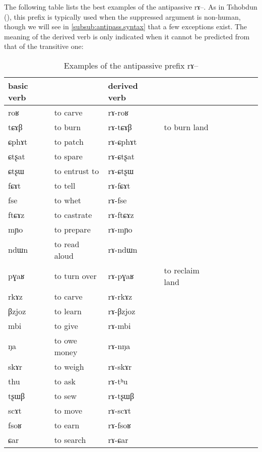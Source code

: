 \documentclass[oldfontcommands,oneside,a4paper,11pt]{memoir}
\newcommand{\ipa}[1]{{\phon #1}} %
\begin{document}
The following table lists the best examples of the antipassive \ipa{rɤ}--. As in Tshobdun (\citealt[8]{jackson06paisheng}), this prefix is typically used when the suppressed argument is non-human, though we will see in \ref{subsub:antipass.syntax} that a few exceptions exist. The meaning of the derived verb is only indicated when it cannot be predicted from that of the transitive one:
\begin{table}[H]
\caption{Examples of the antipassive prefix  \ipa{rɤ}--}\label{tab:antipassive1}
\begin{tabular}{lllllllll} \toprule
basic verb  & &derived  verb &\\
\midrule
\ipa{roʁ}   &	to carve &  	\ipa{rɤ-roʁ}   &	 \\  
\ipa{tɕɤβ}   &	to burn &  	\ipa{rɤ-tɕɤβ}   &	to burn land \\  
\ipa{ɕphɤt}   &	to patch &  	\ipa{rɤ-ɕphɤt}   &	 \\  
\ipa{ɕtʂat}   &	to spare &  	\ipa{rɤ-ɕtʂat}   &	 \\  
\ipa{ɕtʂɯ}   &	to entrust to &  	\ipa{rɤ-ɕtʂɯ}   &	 \\  
\ipa{fɕɤt}   &	to tell &  	\ipa{rɤ-fɕɤt}   &	 \\  
\ipa{fse}   &	to whet &  	\ipa{rɤ-fse}   &	 \\  
\ipa{ftɕɤz}   &	to castrate &  	\ipa{rɤ-ftɕɤz}   &	 \\  
\ipa{mɲo}   &	to prepare &  	\ipa{rɤ-mɲo}   &	 \\  
\ipa{ndɯn}   &	to read aloud &  	\ipa{rɤ-ndɯn}   &	 \\  
\ipa{pɣaʁ}   &	to turn over &  	\ipa{rɤ-pɣaʁ}   &	to reclaim land \\  
\ipa{rkɤz}   &	to carve &  	\ipa{rɤ-rkɤz}   &	 \\  
\ipa{βzjoz}   &	to learn &  	\ipa{rɤ-βzjoz}   &	 \\  
\ipa{mbi}   &	to give &  	\ipa{rɤ-mbi}   &	 \\  
\ipa{ŋa}   &	to owe money &  	\ipa{rɤ-nŋa}   &	 \\  
\ipa{skɤr}   &	to weigh &  	\ipa{rɤ-skɤr}   &	 \\  
\ipa{thu}   &	to ask &  	\ipa{rɤ-tʰu}   &	 \\  
\ipa{tʂɯβ}   &	to sew &  	\ipa{rɤ-tʂɯβ}   &	 \\   
\ipa{scɤt}   &	to move &  	\ipa{rɤ-scɤt}   &	 \\  
\ipa{fsoʁ}   &	to earn &  	\ipa{rɤ-fsoʁ}   &	 \\  
\ipa{ɕar}   &	to search &  	\ipa{rɤ-ɕar}   &	 \\ 
\bottomrule
\end{tabular}
\end{table}
\end{document}
